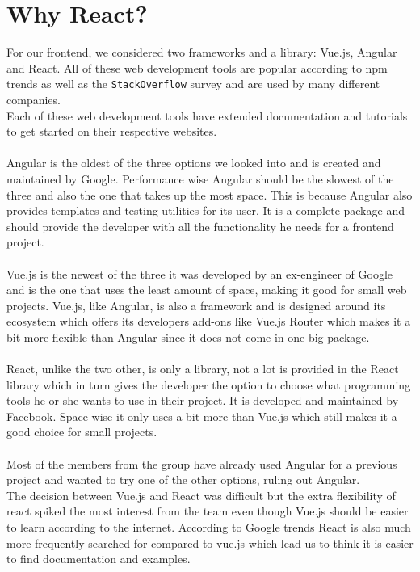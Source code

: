 \section{Why React?}
For our frontend, we considered two frameworks and a library: Vue.js, Angular and React.
All of these web development tools are popular according to npm trends as well as the \texttt{StackOverflow} survey and are used by many different companies\cite{VueReactAngular}.
\\
Each of these web development tools have extended documentation and tutorials to get started on their respective websites.
\\\\
Angular is the oldest of the three options we looked into and is created and maintained by Google\cite{AngularHistory}.
Performance wise Angular should be the slowest of the three and also the one that takes up the most space\cite{VueReactAngular}.
This is because Angular also provides templates and testing utilities for its user.
It is a complete package and should provide the developer with all the functionality he needs for a frontend project.
\\\\
Vue.js is the newest of the three it was developed by an ex-engineer of Google and is the one that uses the least amount of space, making it good for small web projects\cite{ComparisonWithOtherFrameworks}.
Vue.js, like Angular, is also a framework and is designed around its ecosystem which offers its developers add-ons like Vue.js Router which makes it a bit more flexible than Angular since it does not come in one big package.
\\\\
React, unlike the two other, is only a library\cite{ReactJS}, not a lot is provided in the React library which in turn gives the developer the option to choose what programming tools he or she wants to use in their project.
It is developed and maintained by Facebook\cite{ReactHistory}.
Space wise it only uses a bit more than Vue.js which still makes it a good choice for small projects.
\\\\
Most of the members from the group have already used Angular for a previous project and wanted to try one of the other options, ruling out Angular. 
\\
The decision between Vue.js and React was difficult but the extra flexibility of react spiked the most interest from the team even though Vue.js should be easier to learn according to the internet\cite{ComparisonWithOtherFrameworks}.
According to Google trends React is also much more frequently searched for compared to vue.js which lead us to think it is easier to find documentation and examples.

